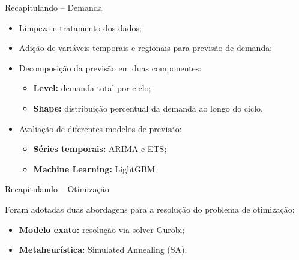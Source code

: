 \documentclass[aspectratio=169,11pt]{beamer}
\begin{document}
\begin{frame}{Recapitulando -- Demanda}
    \small
    \begin{itemize}
        \item Limpeza e tratamento dos dados;

        \item Adição de variáveis temporais e regionais
        para previsão de demanda;

        \item Decomposição da previsão em duas componentes:
        \begin{itemize}
            \item \textbf{Level:} demanda total por ciclo;
            \item \textbf{Shape:} distribuição percentual
            da demanda ao longo do ciclo.
        \end{itemize}

        \item Avaliação de diferentes modelos de previsão:
        \begin{itemize}
            \item \textbf{Séries temporais:} ARIMA e ETS;
            \item \textbf{Machine Learning:} LightGBM.
        \end{itemize}
    \end{itemize}
\end{frame}

\begin{frame}{Recapitulando -- Otimização}
    \small

    Foram adotadas duas abordagens para a resolução
    do problema de otimização:

    \vspace{0.5cm}

    \begin{itemize}
        \setlength{\itemsep}{1em}

        \item \textbf{Modelo exato:}
        resolução via solver Gurobi;

        \item \textbf{Metaheurística:}
        Simulated Annealing (SA).

    \end{itemize}
\end{frame}
\end{document}
